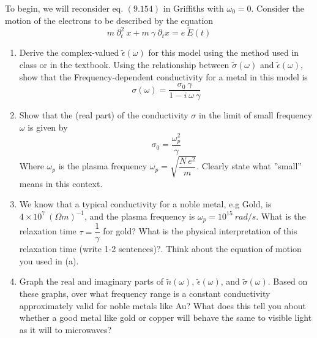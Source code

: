 \documentclass[fleqn]{article}
\begin{document}
\begin{enumerate}
    To begin, we will reconsider eq. $(9.154)$ in Griffiths with $\omega_0=0$. Consider the motion of the electrons
    to be described by the equation
    $$
      m ~ \partial^2_t ~ x+m ~ \gamma ~ \partial_t x=e ~ \tilde{E}(t)
    $$

    \begin{enumerate}
      \item Derive the complex-valued $\tilde{\epsilon}(\omega)$ for this model using the method used in class or in the textbook.
      Using the relationship between $\tilde{\sigma}(\omega)$ and $\tilde{\epsilon}(\omega)$, show that the 
      Frequency-dependent conductivity for a metal in this model is
      $$
        \sigma(\omega)=\dfrac{\sigma_0 ~ \gamma}{1-i ~ \omega ~ \gamma}
      $$


      \item Show that the (real part) of the conductivity $\sigma$ in the limit of small frequency $\omega$ is given by
      $$
        \sigma_0=\dfrac{\omega^2_p}{\gamma}
      $$
      Where $\omega_p$ is the plasma frequency $\omega_p=\sqrt{\dfrac{N ~ e^2}{m}}$. Clearly state what ”small” means in this
      context.

      
      \item We know that a typical conductivity for a noble metal, e.g Gold, is $4 \times 10^7 ~ \left(\Omega m\right)^{-1}$, and the
      plasma frequency is $\omega_p= 10^{15} ~ rad/s$. What is the relaxation time $\tau=\dfrac{1}{\gamma}$ for gold? What
      is the physical interpretation of this relaxation time (write 1-2 sentences)?. Think about the
      equation of motion you used in (a).

      
      \item Graph the real and imaginary parts of $\tilde{n}(\omega)$, $\tilde{\epsilon}(\omega)$, and $\tilde{\sigma}(\omega)$. Based on these graphs, over what
      frequency range is a constant conductivity approximately valid for noble metals like Au? What
      does this tell you about whether a good metal like gold or copper will behave the same to
      visible light as it will to microwaves? 


\end{enumerate}
\end{enumerate}
\end{document}
